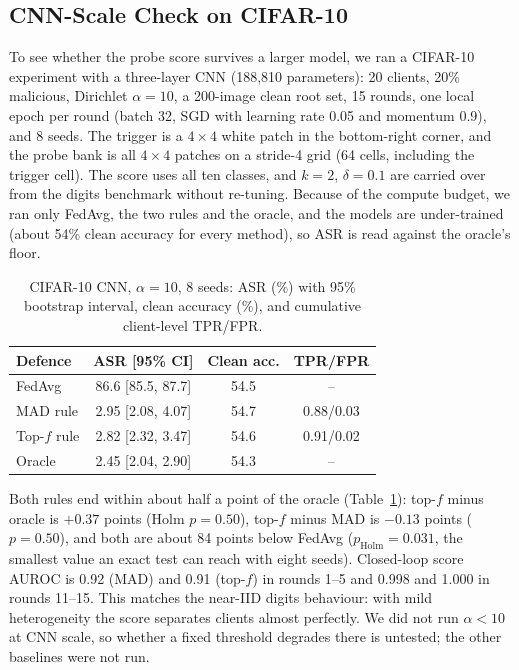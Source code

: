 \subsection{CNN-Scale Check on CIFAR-10}
To see whether the probe score survives a larger model, we ran a CIFAR-10 experiment with a three-layer CNN (188,810 parameters): 20 clients, 20\% malicious, Dirichlet $\alpha=10$, a 200-image clean root set, 15 rounds, one local epoch per round (batch 32, SGD with learning rate 0.05 and momentum 0.9), and 8 seeds. The trigger is a $4{\times}4$ white patch in the bottom-right corner, and the probe bank is all $4{\times}4$ patches on a stride-4 grid (64 cells, including the trigger cell). The score uses all ten classes, and $k=2$, $\delta=0.1$ are carried over from the digits benchmark without re-tuning. Because of the compute budget, we ran only FedAvg, the two rules and the oracle, and the models are under-trained (about 54\% clean accuracy for every method), so ASR is read against the oracle's floor.
\begin{table}[t]
\caption{CIFAR-10 CNN, $\alpha=10$, 8 seeds: ASR (\%) with 95\% bootstrap interval, clean accuracy (\%), and cumulative client-level TPR/FPR.}
\label{tab:cnn}
\centering\footnotesize\setlength{\tabcolsep}{3.5pt}
\begin{tabular}{@{}lccc@{}}
\toprule
Defence & ASR [95\% CI] & Clean acc. & TPR/FPR\\
\midrule
FedAvg & 86.6 [85.5, 87.7] & 54.5 & --\\
MAD rule & 2.95 [2.08, 4.07] & 54.7 & 0.88/0.03\\
Top-$f$ rule & 2.82 [2.32, 3.47] & 54.6 & 0.91/0.02\\
Oracle & 2.45 [2.04, 2.90] & 54.3 & --\\
\bottomrule
\end{tabular}
\end{table}
Both rules end within about half a point of the oracle (Table~\ref{tab:cnn}): top-$f$ minus oracle is $+0.37$ points (Holm $p=0.50$), top-$f$ minus MAD is $-0.13$ points ($p=0.50$), and both are about 84 points below FedAvg ($p_\text{Holm}=0.031$, the smallest value an exact test can reach with eight seeds). Closed-loop score AUROC is 0.92 (MAD) and 0.91 (top-$f$) in rounds 1--5 and 0.998 and 1.000 in rounds 11--15. This matches the near-IID digits behaviour: with mild heterogeneity the score separates clients almost perfectly. We did not run $\alpha<10$ at CNN scale, so whether a fixed threshold degrades there is untested; the other baselines were not run.

